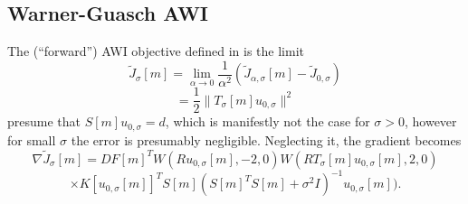 \subsection{Warner-Guasch AWI}
The (``forward'') AWI objective defined in \cite{Warner:16} is
the limit
\[
  \tilde{J}_{\sigma}[m] = \lim_{\alpha \rightarrow 0}
  \frac{1}{\alpha^2}(\tilde{J}_{\alpha,\sigma}[m]-\tilde{J}_{0,\sigma})
\]
\begin{equation}
  \label{eqn:wg}
  = \frac{1}{2} \|T_{\sigma}[m]u_{0,\sigma}\|^2
\end{equation}
\cite{Warner:16} presume that $S[m]u_{0,\sigma} = d$, which is
manifestly not the case for $\sigma > 0$, however for small $\sigma$
the error is presumably negligible. Neglecting it, the gradient becomes
\[
  \nabla \tilde{J}_{\sigma}[m] = DF[m]^T
    W(Ru_{0,\sigma}[m],-2,0)W(RT_{\sigma}[m]u_{0,\sigma}[m],2,0)
\]
\begin{equation}
  \label{eqn:wggrad}
\times K[u_{0,\sigma}[m]]^T S[m](S[m]^TS[m] + \sigma^2I)^{-1}u_{0,\sigma}[m]).
\end{equation}


